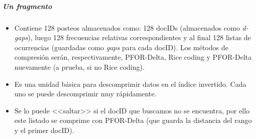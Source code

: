 \subparagraph{Un fragmento}

\begin{itemize}

\item Contiene 128 posteos almacenados como: 128 docIDs (almacenados como \textit{d-gaps}), luego 128 frecuencias relativas correspondientes y al final 128 listas de ocurrencias (guardadas como \textit{gaps} para cada docID). Los métodos de compresión serán, respectivamente, PFOR-Delta, Rice coding y PFOR-Delta nuevamente (a prueba, si no Rice coding).

\item Es una unidad básica para descomprimir datos en el índice invertido. Cada uno se puede descomprimir muy rápidamente.

\item Se lo puede <<saltar>> si el docID que buscamos no se encuentra, por ello este listado se comprime con PFOR-Delta (que guarda la distancia del rango y el primer docID).

\end{itemize}
